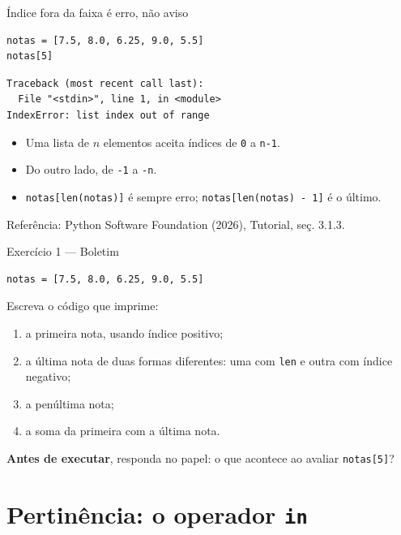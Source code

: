 \documentclass[aspectratio=169]{beamer}
\newcommand{\fonte}[1]{\vfill{\scriptsize\color{UFSGray}Refer\^encia: #1}}
\begin{document}
\begin{frame}[fragile]{Índice fora da faixa é erro, não aviso}
\begin{lstlisting}
notas = [7.5, 8.0, 6.25, 9.0, 5.5]
notas[5]
\end{lstlisting}

\begin{lstlisting}[style=terminal]
Traceback (most recent call last):
  File "<stdin>", line 1, in <module>
IndexError: list index out of range
\end{lstlisting}

\begin{itemize}
  \item Uma lista de $n$ elementos aceita índices de \texttt{0} a \texttt{n-1}.
  \item Do outro lado, de \texttt{-1} a \texttt{-n}.
  \item \texttt{notas[len(notas)]} é sempre erro; \texttt{notas[len(notas) - 1]} é o último.
\end{itemize}

\fonte{Python Software Foundation (2026), Tutorial, se\c{c}. 3.1.3.}
\end{frame}

\begin{frame}[fragile]{Exercício 1 --- Boletim}
\begin{lstlisting}
notas = [7.5, 8.0, 6.25, 9.0, 5.5]
\end{lstlisting}

Escreva o código que imprime:
\begin{enumerate}
  \item a primeira nota, usando índice positivo;
  \item a última nota de duas formas diferentes: uma com \texttt{len} e outra com índice negativo;
  \item a penúltima nota;
  \item a soma da primeira com a última nota.
\end{enumerate}

\textbf{Antes de executar}, responda no papel: o que acontece ao avaliar \texttt{notas[5]}?
\end{frame}

\section{Pertinência: o operador \texttt{in}}
\end{document}
